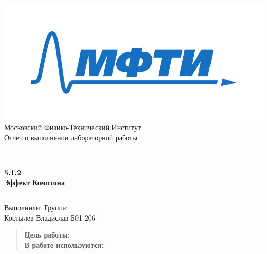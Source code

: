 \documentclass[a4paper, 12pt]{article}
\begin{document}

\begin{titlepage}
    \vspace*{\fill}
    
    \begin{center}
        \includegraphics[scale=0.8]{res/MIPT.pdf}
        \\[0.7cm]\Huge Московский Физико-Технический Институт
        \\[2cm]\LARGE Отчет о выполнении лабораторной работы 
        \\[0.5cm]\noindent\rule{\textwidth}{1pt}
        \\\Huge\textbf{5.1.2 \\ Эффект Комптона}
        \\[-0.5cm]\noindent\rule{\textwidth}{1pt}
    \end{center}
    
    \vspace*{\fill}
    
    \begin{flushleft}
        Выполнили: \hspace{\fill} Группа:
        \\Костылев Владислав \hspace{\fill} Б01-206
    \end{flushleft}
\end{titlepage}

\setcounter{page}{2}


\begin{abstract}
    \textbf{Цель работы:} \\
    
    \textbf{В работе используются:} 
\end{abstract}

\tableofcontents
\newpage
\end{document}
